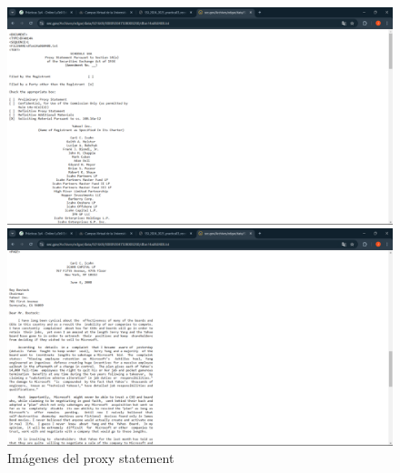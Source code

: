\documentclass[12pt]{book}
\begin{document}
\begin{figure}[h]
    \centering
    \begin{minipage}{0.45\textwidth}
        \centering
        \includegraphics[width=\textwidth]{Practica 3y4/images/Captura de pantalla (87).png}
    \end{minipage}\hfill
    \begin{minipage}{0.45\textwidth}
        \centering
        \includegraphics[width=\textwidth]{Practica 3y4/images/Captura de pantalla (90).png}
    \end{minipage}
    \caption{Imágenes del proxy statement}
\end{figure}
\end{document}

